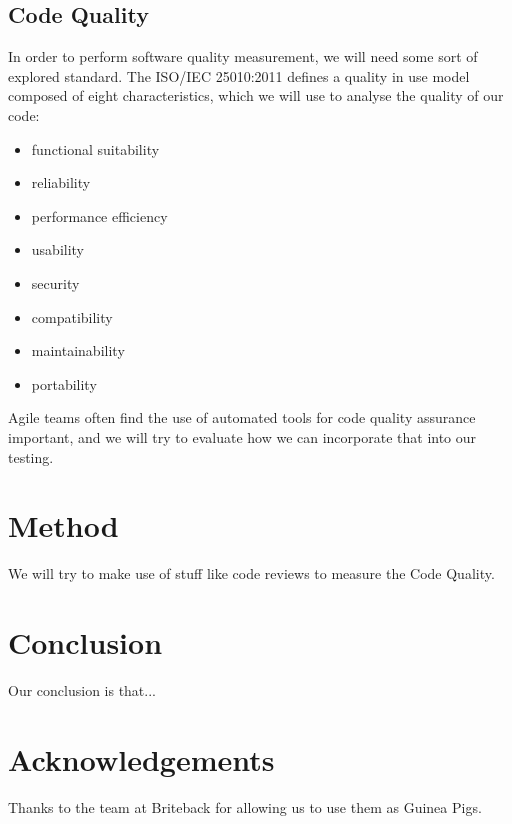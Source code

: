 \documentclass{sigchi}
\begin{document}
\subsection{Code Quality}
In order to perform software quality measurement, we will need some sort of explored standard.
The ISO/IEC 25010:2011 defines a quality in use model composed of eight characteristics\cite{iso250102011},
which we will use to analyse the quality of our code:
\begin{itemize}
\setlength{\itemsep}{0.25em}
\item functional suitability
\item reliability
\item performance efficiency
\item usability
\item security
\item compatibility
\item maintainability
\item portability
\end{itemize}

Agile teams often find the use of automated tools for code quality assurance important\cite{Williams:2012:ATT:2133806.2133823}, and we will try to evaluate how we can incorporate that into our testing\cite{ala2005survey}.

\section{Method}

We will try to make use of stuff like code reviews to measure the Code Quality.

\section{Conclusion}

Our conclusion is that...

\section{Acknowledgements}

Thanks to the team at Briteback for allowing us to use them as Guinea Pigs.

%
%
%
%
%
\balance




\end{document}

